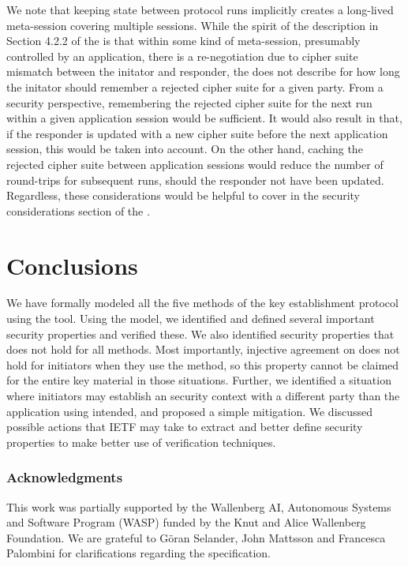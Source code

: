 \documentclass[runningheads,draft,x11names]{llncs}
\begin{document}
We note that keeping state between protocol runs implicitly creates a long-lived
meta-session covering multiple \mEdhoc{} sessions.
%
While the spirit of the description in Section 4.2.2 of the \mSpec{} is that
within some kind of meta-session, presumably controlled by an application,
there is a re-negotiation due to
cipher suite mismatch between the initator and responder, the \mSpec{} does not
describe for how long the initator should remember a rejected cipher suite for a
given party.
%
From a security perspective, remembering the rejected cipher suite for the
next \mEdhoc{} run within a given application session would be sufficient.
%
It would also result in that, if the responder is updated with a new cipher
suite before the next application session, this would be taken into account.
%
On the other hand, caching the rejected cipher suite between application
sessions would reduce the number of round-trips for subsequent runs, should
the responder not have been updated.
%
Regardless, these considerations would be helpful to cover in the security
considerations section of the \mSpec{}.
%

\section{Conclusions}
\label{sec:conclusions}
We have formally modeled all the five
methods of the \mEdhoc{} key establishment protocol using the \mTamarin{} tool.
%
Using the model, we identified and defined several important security properties
and verified these.
%
We also identified security properties that does not hold for all
methods.
%
Most importantly, injective agreement on \mGiy{} does not hold for
initiators when they use the \mStat{} method, so this property cannot be claimed
for the entire key material in those situations.
%
Further, we identified a situation where initiators may establish an \mOscore{}
security context with a different party than the application using \mEdhoc{}
intended, and proposed a simple mitigation.
%
We discussed possible actions that IETF may take to extract and better define
security properties to make better use of verification techniques.
%

\subsubsection*{Acknowledgments} This work was partially supported by
the Wallenberg AI, Autonomous Systems and Software Program (WASP) funded by
the Knut and Alice Wallenberg Foundation.
%
We are grateful to G\"oran Selander, John Mattsson and Francesca Palombini for
clarifications regarding the specification.
%



\end{document}
